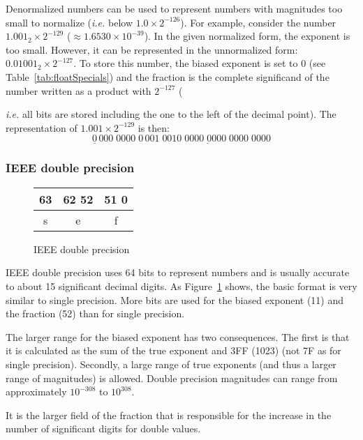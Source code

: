 Denormalized numbers can be used to represent numbers with magnitudes too
small to normalize (\emph{i.e.} below $1.0 \times 2^{-126}$). For example,
consider the number $1.001_2 \times 2^{-129}$ 
($\approx 1.6530 \times 10^{-39}$). In the given normalized form, the 
exponent is too small. However, it can be represented in the unnormalized 
form: $0.01001_2 \times 2^{-127}$. To store this number, the biased exponent
is set to 0 (see Table~\ref{tab:floatSpecials}) and the fraction is the 
complete significand of the number written as a product with $2^{-127}$ 
({\emph{i.e.} all bits are stored including the one to the left of the 
decimal point). The representation of $1.001 \times 2^{-129}$ is then:
\[ \underline{0}\,000\;0000\;0
   \,\underline{001\;0010\;0000\;0000\;0000\;0000} \]


\subsubsection{IEEE double precision}

\begin{figure}[t]
\centering
\begin{tabular}{|c|c|c|}
\multicolumn{1}{p{0.3cm}}{63} &
\multicolumn{1}{p{3cm}}{62 \hfill 52} &
\multicolumn{1}{p{7cm}}{51 \hfill 0} \\
\hline
s & e & f \\
\hline
\end{tabular}
\caption{IEEE double precision\label{fig:IEEEdouble}}
\end{figure}

IEEE double precision uses 64 bits to represent numbers and is usually
accurate to about 15 significant decimal digits. As 
Figure~\ref{fig:IEEEdouble} shows, the basic format is very similar to 
single precision. More bits are used for the biased exponent (11) and the
fraction (52) than for single precision.

The larger range for the biased exponent has two consequences. The first is
that it is calculated as the sum of the true exponent and 3FF (1023) (not
7F as for single precision). Secondly, a large range of true exponents (and
thus a larger range of magnitudes) is allowed. Double precision magnitudes
can range from approximately $10^{-308}$ to $10^{308}$.

It is the larger field of the fraction that is responsible for the increase
in the number of significant digits for double values.

}
